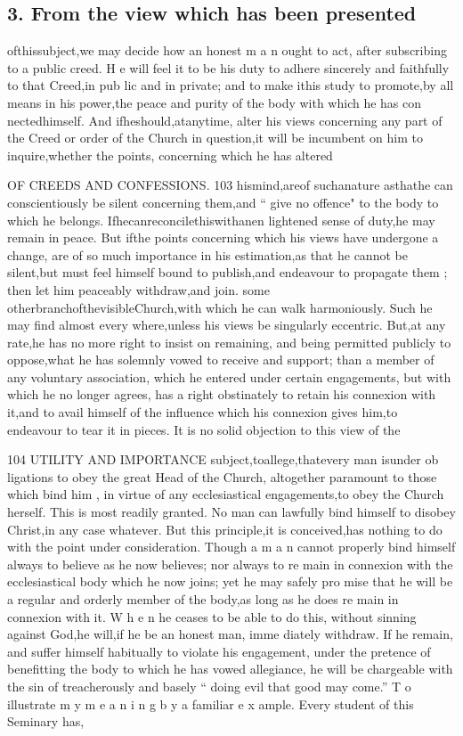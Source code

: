 \documentclass[
]{book}
\begin{document}
\hypertarget{from-the-view-which-has-been-presented}{%
\subsection{3. From the view which has been presented}\label{from-the-view-which-has-been-presented}}

ofthissubject,we may decide how an honest m a n ought to act, after subscribing to a public creed. H e will feel it to be his duty to adhere
sincerely and faithfully to that Creed,in pub
lic and in private; and to make ithis study to
promote,by all means in his power,the peace
and purity of the body with which he has con nectedhimself. And ifheshould,atanytime,
alter his views concerning any part of the Creed or order of the Church in question,it
will be incumbent on him to inquire,whether the points, concerning which he has altered

OF CREEDS AND CONFESSIONS. 103
hismind,areof suchanature asthathe can conscientiously be silent concerning them,and
`` give no offence" to the body to which he belongs. Ifhecanreconcilethiswithanen
lightened sense of duty,he may remain in peace. But ifthe points concerning which his views have undergone a change, are of so much importance in his estimation,as that he cannot be silent,but must feel himself bound to publish,and endeavour to propagate them ; then let him peaceably withdraw,and join. some otherbranchofthevisibleChurch,with which he can walk harmoniously. Such he may find almost every where,unless his views
be singularly eccentric. But,at any rate,he has no more right to insist on remaining, and being permitted publicly to oppose,what he has solemnly vowed to receive and support; than a member of any voluntary association, which he entered under certain engagements, but with which he no longer agrees, has a
right obstinately to retain his connexion with
it,and to avail himself of the influence which
his connexion gives him,to endeavour to tear it in pieces.
It is no solid objection to this view of the

104 UTILITY AND IMPORTANCE
subject,toallege,thatevery man isunder ob ligations to obey the great Head of the Church, altogether paramount to those which bind him , in virtue of any ecclesiastical engagements,to
obey the Church herself. This is most readily granted. No man can lawfully bind himself
to disobey Christ,in any case whatever. But
this principle,it is conceived,has nothing to do with the point under consideration. Though a m a n cannot properly bind himself always to believe as he now believes; nor always to re main in connexion with the ecclesiastical body which he now joins; yet he may safely pro mise that he will be a regular and orderly
member of the body,as long as he does re main in connexion with it. W h e n he ceases
to be able to do this, without sinning against
God,he will,if he be an honest man, imme
diately withdraw. If he remain, and suffer himself habitually to violate his engagement,
under the pretence of benefitting the body to which he has vowed allegiance, he will be chargeable with the sin of treacherously and basely `` doing evil that good may come.''
T o illustrate m y m e a n i n g b y a familiar e x ample. Every student of this Seminary has,
\end{document}
